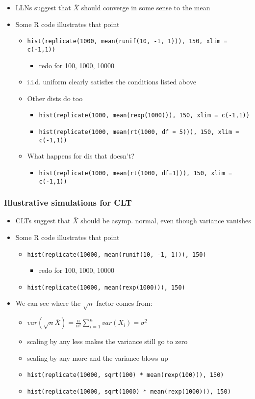 \documentclass[11pt]{article}
\begin{document}
\begin{itemize}
\item LLNs suggest that $\bar X$ should converge in some sense to the mean
\item Some R code illustrates that point
\begin{itemize}
\item \texttt{hist(replicate(1000, mean(runif(10, -1, 1))), 150, xlim = c(-1,1))}
\begin{itemize}
\item redo for 100, 1000, 10000
\end{itemize}
\item i.i.d. uniform clearly satisfies the conditions listed above
\item Other dists do too
\begin{itemize}
\item \texttt{hist(replicate(1000, mean(rexp(1000))), 150, xlim = c(-1,1))}
\item \texttt{hist(replicate(1000, mean(rt(1000, df = 5))), 150, xlim = c(-1,1))}
\end{itemize}
\item What happens for dis that doesn't?
\begin{itemize}
\item \texttt{hist(replicate(1000, mean(rt(1000, df=1))), 150, xlim = c(-1,1))}
\end{itemize}
\end{itemize}
\end{itemize}
\subsubsection{Illustrative simulations for CLT}
\label{sec-1-1-3}

\begin{itemize}
\item CLTs suggest that $\bar X$ should be asymp. normal, even though variance vanishes
\item Some R code illustrates that point
\begin{itemize}
\item \texttt{hist(replicate(10000, mean(runif(10, -1, 1))), 150)}
\begin{itemize}
\item redo for 100, 1000, 10000
\end{itemize}
\item \texttt{hist(replicate(10000, mean(rexp(1000))), 150)}
\end{itemize}
\item We can see where the $\sqrt{n}$ factor comes from:
\begin{itemize}
\item $var(\sqrt{n} \bar X) = \frac{n}{n^2} \sum_{i=1}^n var(X_i) = \sigma^2$
\item scaling by any less makes the variance still go to zero
\item scaling by any more and the variance blows up
\item \texttt{hist(replicate(10000, sqrt(100) * mean(rexp(100))), 150)}
\item \texttt{hist(replicate(10000, sqrt(1000) * mean(rexp(1000))), 150)}
\end{itemize}
\end{itemize}
\end{document}
